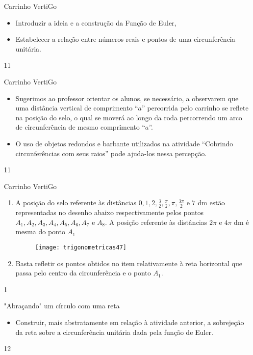 \cleardoublepage
\def\currentcolor{session1}
\begin{objectives}{Carrinho VertiGo}
{
\begin{itemize}
\item Introduzir a ideia e a construção da Função de Euler,
\item Estabelecer a relação entre números reais e pontos de uma circunferência unitária.
\end{itemize}
}{1}{1}
\end{objectives}
\begin{sugestions}{Carrinho VertiGo}
{
\begin{itemize}
\item Sugerimos ao professor orientar os alunos, se necessário, a observarem que uma distância vertical de comprimento “$a$”{} percorrida pelo carrinho se reflete na posição do selo, o qual se moverá ao longo da roda percorrendo um arco de circunferência de mesmo comprimento “$a$”.
\item  O uso de objetos redondos e barbante utilizados na atividade “Cobrindo circunferências com seus raios”{} pode ajuda-los nessa percepção.
\end{itemize}
}{1}{1}
\end{sugestions}
\clearmargin
\begin{answer}{Carrinho VertiGo}
{
 \begin{enumerate}
 \item A posição do selo referente às distâncias $0, 1, 2, \frac{3}{2}, \frac{\pi}{2}, \pi, \frac{3\pi}{2}$ e $7$ dm estão representadas  no desenho abaixo respectivamente pelos pontos $A_1, A_2, A_3, A_4, A_5, A_6, A_7\text{ e }A_8$. A posição referente às distâncias $2\pi$ e $4\pi$ dm é mesma do ponto $A_1$

 \begin{figure}[H]
 \centering
 
 \texttt{[image: trigonometricas47]}
 \end{figure}
 \item Basta refletir os pontos obtidos no item  relativamente à reta horizontal que passa pelo centro da circunferência e o ponto $A_1$.
 \end{enumerate}
}{1}
\end{answer}
\begin{objectives}{"Abraçando"{} um círculo com uma reta}
{
\begin{itemize}
\item Construir, mais abstratamente em relação à atividade anterior, a sobrejeção da reta sobre a circunferência unitária dada pela função de Euler.
\end{itemize}
}{1}{2}
\end{objectives}

